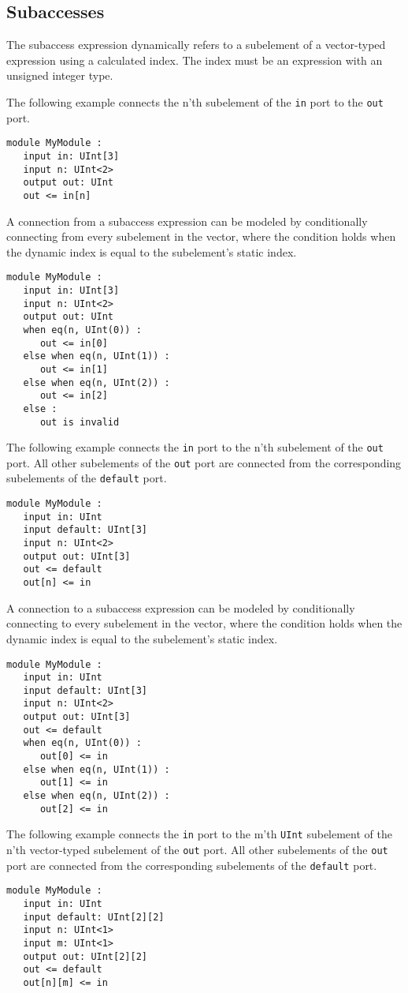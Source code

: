 \documentclass[12pt]{article}
\begin{document}
\subsection{Subaccesses}
The subaccess expression dynamically refers to a subelement of a vector-typed expression using a calculated index. The index must be an expression with an unsigned integer type.

The following example connects the n'th subelement of the \verb|in| port to the \verb|out| port.
\begin{verbatim}
module MyModule :
   input in: UInt[3]
   input n: UInt<2>
   output out: UInt
   out <= in[n]
\end{verbatim}

A connection from a subaccess expression can be modeled by conditionally connecting from every subelement in the vector, where the condition holds when the dynamic index is equal to the subelement's static index.
\begin{verbatim}
module MyModule :
   input in: UInt[3]
   input n: UInt<2>
   output out: UInt
   when eq(n, UInt(0)) :
      out <= in[0]
   else when eq(n, UInt(1)) :
      out <= in[1]
   else when eq(n, UInt(2)) :
      out <= in[2]            
   else :
      out is invalid
\end{verbatim}

The following example connects the \verb|in| port to the n'th subelement of the \verb|out| port. All other subelements of the \verb|out| port are connected from the corresponding subelements of the \verb|default| port.
\begin{verbatim}
module MyModule :
   input in: UInt
   input default: UInt[3]
   input n: UInt<2>
   output out: UInt[3]
   out <= default
   out[n] <= in
\end{verbatim}

A connection to a subaccess expression can be modeled by conditionally connecting to every subelement in the vector, where the condition holds when the dynamic index is equal to the subelement's static index.
\begin{verbatim}
module MyModule :
   input in: UInt
   input default: UInt[3]
   input n: UInt<2>
   output out: UInt[3]   
   out <= default
   when eq(n, UInt(0)) :
      out[0] <= in
   else when eq(n, UInt(1)) :
      out[1] <= in
   else when eq(n, UInt(2)) :
      out[2] <= in
\end{verbatim}

The following example connects the \verb|in| port to the m'th \verb|UInt| subelement of the n'th vector-typed subelement of the \verb|out| port. All other subelements of the \verb|out| port are connected from the corresponding subelements of the \verb|default| port.
\begin{verbatim}
module MyModule :
   input in: UInt
   input default: UInt[2][2]
   input n: UInt<1>
   input m: UInt<1>
   output out: UInt[2][2]
   out <= default
   out[n][m] <= in
\end{verbatim}
\end{document}
